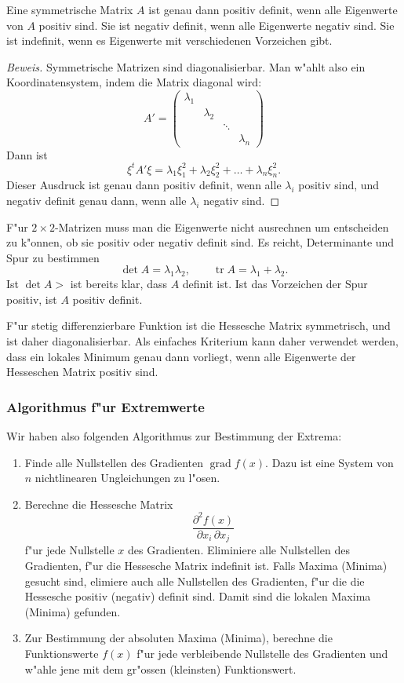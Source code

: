 \begin{satz}Eine symmetrische Matrix $A$ ist genau dann positiv
definit, wenn alle Eigenwerte von $A$ positiv sind. Sie ist negativ
definit, wenn alle Eigenwerte negativ sind. Sie ist indefinit,
wenn es Eigenwerte mit verschiedenen Vorzeichen gibt.
\end{satz}

\begin{proof}[Beweis]
Symmetrische Matrizen sind diagonalisierbar.
Man w"ahlt also ein Koordinatensystem, indem die Matrix diagonal wird:
\[
A'=\begin{pmatrix}
\lambda_1&         &      &         \\
         &\lambda_2&      &         \\
         &         &\ddots&         \\
         &         &      &\lambda_n
\end{pmatrix}
\]
Dann ist
\[
\xi^tA'\xi =\lambda_1\xi_1^2+\lambda_2\xi_2^2+\dots+\lambda_n\xi_n^2.
\]
Dieser Ausdruck ist genau dann positiv definit, wenn alle $\lambda_i$ positiv
sind, und negativ definit genau dann, wenn alle $\lambda_i$
negativ sind.
\end{proof}

F"ur $2\times 2$-Matrizen muss man die Eigenwerte nicht ausrechnen
um entscheiden zu k"onnen, ob sie positiv oder negativ definit sind.
Es reicht, Determinante und Spur zu bestimmen
\[
\det A = \lambda_1\lambda_2,\qquad \operatorname{tr} A=\lambda_1+\lambda_2.
\]
Ist $\det A >$ ist bereits klar, dass $A$ definit ist. Ist das Vorzeichen
der Spur positiv, ist $A$ positiv definit.

F"ur stetig differenzierbare Funktion ist die Hessesche Matrix
symmetrisch, und ist daher diagonalisierbar.
Als einfaches Kriterium kann daher
verwendet werden, dass ein lokales Minimum genau dann vorliegt,
wenn alle Eigenwerte der Hesseschen Matrix positiv sind.

\subsubsection{Algorithmus f"ur Extremwerte}
Wir haben also folgenden Algorithmus zur Bestimmung der Extrema:
\begin{enumerate}
\item
Finde alle Nullstellen des Gradienten
$\operatorname{grad}f(x)$.
Dazu ist eine System von $n$ nichtlinearen Ungleichungen zu l"osen.
\item
Berechne die Hessesche Matrix
\[
\frac{\partial^2 f(x)}{\partial x_i\,\partial x_j}
\]
f"ur jede Nullstelle $x$ des Gradienten.
Eliminiere alle Nullstellen
des Gradienten, f"ur die Hessesche Matrix indefinit ist.
Falls Maxima (Minima) gesucht sind, elimiere auch alle Nullstellen
des Gradienten, f"ur die die Hessesche positiv (negativ) definit sind.
Damit sind die lokalen Maxima (Minima) gefunden.
\item 
Zur Bestimmung der absoluten Maxima (Minima), berechne die Funktionswerte
$f(x)$ f"ur jede verbleibende Nullstelle des Gradienten und w"ahle jene
mit dem gr"ossen (kleinsten) Funktionswert.
\end{enumerate}


